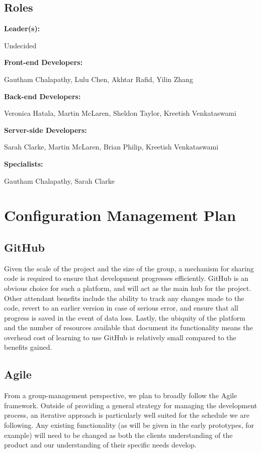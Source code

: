 \documentclass[11pt]{article}
\begin{document}
\subsection{Roles}
\textbf{Leader(s):}
\begin{addmargin}[1em]{2em} Undecided \end{addmargin}\vspace{2mm}
\textbf{Front-end Developers:}
\begin{addmargin}[1em]{2em} Gautham Chalapathy, Lulu Chen, Akhtar Rafid, Yilin Zhang
\end{addmargin}\vspace{2mm}
\textbf{Back-end Developers:}
\begin{addmargin}[1em]{2em} Veronica Hatala, Martin McLaren, Sheldon Taylor, Kreetish Venkataswami
\end{addmargin}\vspace{2mm}
\textbf{Server-side Developers:}
\begin{addmargin}[1em]{2em} Sarah Clarke, Martin McLaren, Brian Philip, Kreetish Venkataswami
\end{addmargin}\vspace{2mm}
\textbf{Specialists:}
\begin{addmargin}[1em]{2em} Gautham Chalapathy, Sarah Clarke \end{addmargin}\vspace{2mm}

\section{Configuration Management Plan}

\subsection{GitHub}
Given the scale of the project and the size of the group, a mechanism for sharing code is required
to ensure that development progresses efficiently. GitHub is an obvious choice for such a platform,
and will act as the main hub for the project. Other attendant benefits include the ability to track
any changes made to the code, revert to an earlier version in case of serious error, and ensure that
all progress is saved in the event of data loss. Lastly, the ubiquity of the platform and the number
of resources available that document its functionality means the overhead cost of learning to use
GitHub is relatively small compared to the benefits gained.

\subsection{Agile}
From a group-management perspective, we plan to broadly follow the Agile framework. Outside of
providing a general strategy for managing the development process, an iterative approach is
particularly well suited for the schedule we are following. Any existing functionality (as will be
given in the early prototypes, for example) will need to be changed as both the clients
understanding of the product and our understanding of their specific needs develop.
\end{document}
